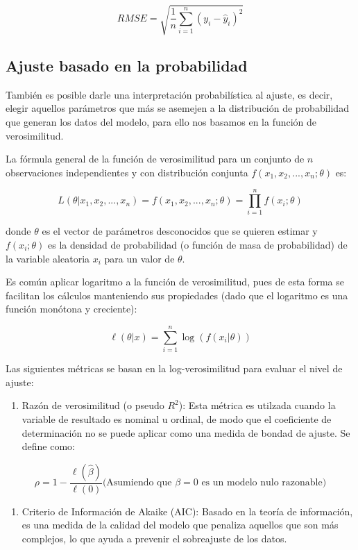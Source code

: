 \documentclass[
]{book}
\providecommand{\tightlist}{%
  \setlength{\itemsep}{0pt}\setlength{\parskip}{0pt}}
\begin{document}
\[ RMSE = \sqrt{\frac{1}{n}\sum_{i=1}^n(y_i - \hat{y}_i)^2} \]

\hypertarget{ajuste-basado-en-la-probabilidad-1}{%
\subsection{Ajuste basado en la probabilidad}\label{ajuste-basado-en-la-probabilidad-1}}

También es posible darle una interpretación probabilística al ajuste, es
decir, elegir aquellos parámetros que más se asemejen a la distribución
de probabilidad que generan los datos del modelo, para ello nos basamos
en la función de verosimilitud.

La fórmula general de la función de verosimilitud para un conjunto de
\(n\) observaciones independientes y con distribución conjunta
\(f(x_1, x_2, ..., x_n; θ)\) es:

\[L(\theta | x_1, x_2, ..., x_n) = f(x_1, x_2, ..., x_n; \theta) = \prod_{i=1}^{n} f(x_i;\theta)\]

donde \(θ\) es el vector de parámetros desconocidos que se quieren estimar
y \(f(x_i; θ)\) es la densidad de probabilidad (o función de masa de
probabilidad) de la variable aleatoria \(x_i\) para un valor de \(θ\).

Es común aplicar logaritmo a la función de verosimilitud, pues de esta
forma se facilitan los cálculos manteniendo sus propiedades (dado que el
logaritmo es una función monótona y creciente):

\[\ell(\theta | x) = \sum_{i=1}^{n} \log(f(x_i|\theta))\]

Las siguientes métricas se basan en la log-verosimilitud para evaluar el
nivel de ajuste:

\begin{enumerate}
\def\labelenumi{\arabic{enumi}.}
\tightlist
\item
  Razón de verosimilitud (o pseudo \(R^2\)): Esta métrica es utilzada
  cuando la variable de resultado es nominal u ordinal, de modo que el
  coeficiente de determinación no se puede aplicar como una medida de
  bondad de ajuste. Se define como:
\end{enumerate}

\[\rho = 1 - \frac{\ell(\hat{\beta})}{\ell(0)} \text{(Asumiendo que $\beta=0$ es un modelo nulo razonable)}\]

\begin{enumerate}
\def\labelenumi{\arabic{enumi}.}
\setcounter{enumi}{1}
\tightlist
\item
  Criterio de Información de Akaike (AIC): Basado en la teoría de
  información, es una medida de la calidad del modelo que penaliza
  aquellos que son más complejos, lo que ayuda a prevenir el
  sobreajuste de los datos.
\end{enumerate}
\end{document}
